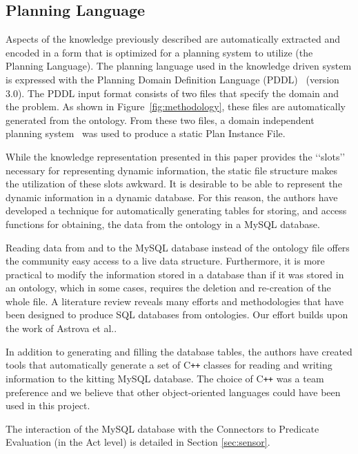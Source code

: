 \subsection{Planning Language}
Aspects of the knowledge previously described are automatically extracted and encoded in a form
that is optimized for a planning system to utilize (the Planning Language).
The planning language used in the knowledge driven system is expressed with
the Planning Domain Definition Language (PDDL)~\cite{PDDL} (version 3.0).
The PDDL input format consists of two files that specify the domain and the
problem. As shown in Figure~\ref{fig:methodology}, these files are
automatically generated from the ontology. From
these two files, a domain independent planning
system~\cite{Coles.ICAPS.2010} was used to produce a static \textsf{Plan Instance File}.

While the knowledge representation presented in this paper provides the \lq\lq{}slots\rq\rq{} necessary for representing dynamic information, the
static file structure makes the utilization of these slots awkward. It is desirable to be able to represent the dynamic information in a dynamic database. For this reason, the authors have developed a technique for automatically generating tables for storing,  and access functions for obtaining, the data from the ontology in a MySQL database.

Reading data from and to the MySQL database instead of the ontology file offers the community easy access to a live data structure. Furthermore, it is more practical to modify the information stored in a database than if it was stored in an ontology, which in some cases, requires the deletion and re-creation of the whole file. A literature review reveals many efforts and methodologies that have been designed to produce SQL databases from ontologies. Our effort builds upon the work of Astrova et al.\cite{Astrova2007}. 

In addition to generating and filling the database tables, the authors have created tools that automatically generate a set of C{}\texttt{++} classes for reading and writing
information to the kitting MySQL database. The choice of C{}\texttt{++} was a team preference and we believe that other object-oriented languages could have been used in this project.

The interaction of the MySQL database with the Connectors to Predicate Evaluation (in the Act level) is detailed in Section \ref{sec:sensor}.

